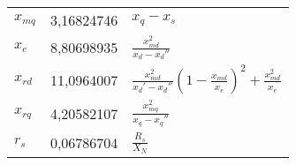 \begin{longtable}[]{@{}lll@{}}
\begin{minipage}[t]{0.10\columnwidth}\raggedright
\(x_{mq}\)\strut
\end{minipage} & \begin{minipage}[t]{0.25\columnwidth}\raggedright
3,16824746\strut
\end{minipage} & \begin{minipage}[t]{0.55\columnwidth}\raggedright
\(x_q-x_s\)\strut
\end{minipage}\tabularnewline
\begin{minipage}[t]{0.10\columnwidth}\raggedright
\(x_e\)\strut
\end{minipage} & \begin{minipage}[t]{0.25\columnwidth}\raggedright
8,80698935\strut
\end{minipage} & \begin{minipage}[t]{0.55\columnwidth}\raggedright
\(\frac{x_{md}^2}{x_d-x_d''}\)\strut
\end{minipage}\tabularnewline
\begin{minipage}[t]{0.10\columnwidth}\raggedright
\(x_{rd}\)\strut
\end{minipage} & \begin{minipage}[t]{0.25\columnwidth}\raggedright
11,0964007\strut
\end{minipage} & \begin{minipage}[t]{0.55\columnwidth}\raggedright
\(\frac{x_{md}^2}{x_d'-x_d''}(1-\frac{x_{md}}{x_e})^2+\frac{x_{md}^2}{x_e}\)\strut
\end{minipage}\tabularnewline
\begin{minipage}[t]{0.10\columnwidth}\raggedright
\(x_{rq}\)\strut
\end{minipage} & \begin{minipage}[t]{0.25\columnwidth}\raggedright
4,20582107\strut
\end{minipage} & \begin{minipage}[t]{0.55\columnwidth}\raggedright
\(\frac{x_{mq}^2}{x_q-x_q''}\)\strut
\end{minipage}\tabularnewline
\begin{minipage}[t]{0.10\columnwidth}\raggedright
\(r_s\)\strut
\end{minipage} & \begin{minipage}[t]{0.25\columnwidth}\raggedright
0,06786704\strut
\end{minipage} & \begin{minipage}[t]{0.55\columnwidth}\raggedright
\(\frac{R_s}{X_N}\)\strut
\end{minipage}\tabularnewline

\end{longtable}
